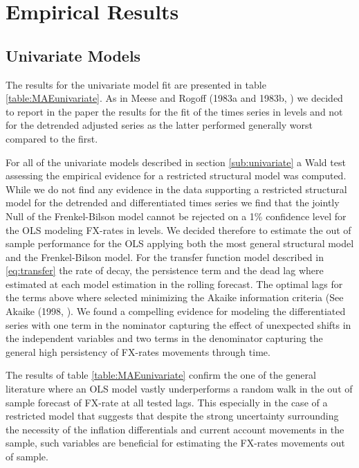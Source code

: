 \section{Empirical Results}
\label{sec:results}

\subsection{Univariate Models}

The results for the univariate model fit are presented in table \ref{table:MAEunivariate}. As in Meese and Rogoff
(1983a and 1983b, \cite{MeeseRogoffa, MeeseRogoffb}) we decided to report in the paper the results for the
fit of the times series in levels and not for the detrended adjusted series as the latter
performed generally worst compared to the first. 

For all of the univariate models described in section \ref{sub:univariate} a Wald test assessing the empirical evidence
for a restricted structural model was computed. While we do not find
any evidence in the data supporting a restricted  structural model for the detrended and differentiated times series we find
that the jointly Null of the Frenkel-Bilson model cannot be rejected on a 1\% confidence level for the OLS modeling FX-rates in levels.
We decided therefore to estimate the out of sample performance for the OLS applying both the most
general structural model and the Frenkel-Bilson model. 
For the transfer function model described in \ref{eq:transfer} the rate of decay, the persistence term and the dead lag where estimated at each model
estimation in the rolling forecast. The optimal lags for the terms above where selected minimizing the Akaike information criteria
(See Akaike (1998, \cite{Akaike}). We found a compelling evidence for modeling the differentiated series with one term in the nominator
capturing the effect of unexpected shifts in the independent variables and two terms in the denominator capturing the general
high persistency of FX-rates movements through time.

The results of table \ref{table:MAEunivariate} confirm the one of the general literature where an OLS model vastly underperforms a random walk
in the out of sample forecast of FX-rate at all tested lags. This especially in the case of a restricted model that suggests that despite the strong
uncertainty surrounding the necessity of the inflation differentials and current account movements in the sample, such variables are beneficial for estimating
the FX-rates movements out of sample.

